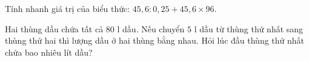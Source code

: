\begin{ex} %
Tính nhanh giá trị của biểu thức: $45{,}6 : 0{,}25 + 45{,}6 \times 96$.
\end{ex}

\begin{ex} %
Hai thùng dầu chứa tất cả $80\text{ l}$ dầu. Nếu chuyển $5\text{ l}$ dầu từ thùng thứ nhất sang thùng thứ hai thì lượng dầu ở hai thùng bằng nhau. Hỏi lúc đầu thùng thứ nhất chứa bao nhiêu lít dầu?
\end{ex}
